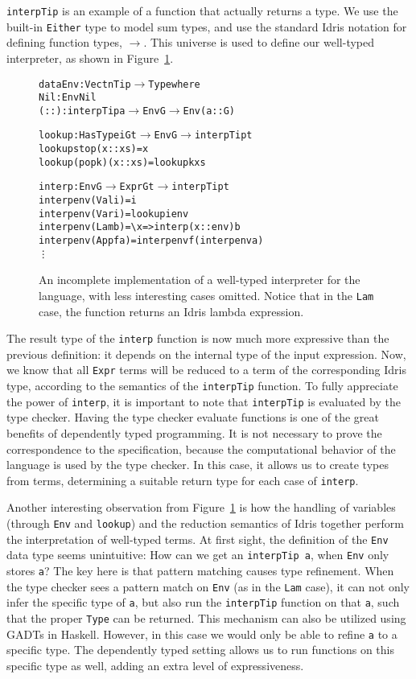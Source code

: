 \texttt{interpTip} is an example of a function that actually returns a type. We use the built-in \texttt{Either} type to model sum types, and use the standard Idris notation for defining function types, $\to$. This universe is used to define our well-typed interpreter, as shown in Figure~\ref{fig:well-typed-interpreter}.

\begin{figure}
\begin{alltt}
data Env : Vect n Tip \(\to\) Type where
  Nil  : Env Nil
  (::) : interpTip a \(\to\) Env G \(\to\) Env (a :: G)

lookup : HasType i G t \(\to\) Env G \(\to\) interpTip t
lookup stop    (x :: xs) = x
lookup (pop k) (x :: xs) = lookup k xs

interp : Env G \(\to\) Expr G t \(\to\) interpTip t
interp env (Val i)   = i
interp env (Var i)   = lookup i env
interp env (Lam b)   = \textbackslash{x} => interp (x :: env) b
interp env (App f a) = interp env f (interp env a)
\vdots
\end{alltt}
\caption{An incomplete implementation of a well-typed interpreter for the language, with less interesting cases omitted. Notice that in the \texttt{Lam} case, the function returns an Idris lambda expression.}
\label{fig:well-typed-interpreter}
\end{figure}

The result type of the \texttt{interp} function is now much more expressive than the previous definition: it depends on the internal type of the input expression. Now, we know that all \texttt{Expr} terms will be reduced to a term of the corresponding Idris type, according to the semantics of the \texttt{interpTip} function. To fully appreciate the power of \texttt{interp}, it is important to note that \texttt{interpTip} is evaluated by the type checker. Having the type checker evaluate functions is one of the great benefits of dependently typed programming. It is not necessary to prove the correspondence to the specification, because the computational behavior of the language is used by the type checker. In this case, it allows us to create types from terms, determining a suitable return type for each case of \texttt{interp}.

Another interesting observation from Figure~\ref{fig:well-typed-interpreter} is how the handling of variables (through \texttt{Env} and \texttt{lookup}) and the reduction semantics of Idris together perform the interpretation of well-typed terms. At first sight, the definition of the \texttt{Env} data type seems unintuitive: How can we get an \texttt{interpTip a}, when \texttt{Env} only stores \texttt{a}? The key here is that pattern matching causes type refinement. When the type checker sees a pattern match on \texttt{Env} (as in the \texttt{Lam} case), it can not only infer the specific type of \texttt{a}, but also run the \texttt{interpTip} function on that \texttt{a}, such that the proper \texttt{Type} can be returned. This mechanism can also be utilized using GADTs in Haskell. However, in this case we would only be able to refine \texttt{a} to a specific type. The dependently typed setting allows us to run functions on this specific type as well, adding an extra level of expressiveness.

